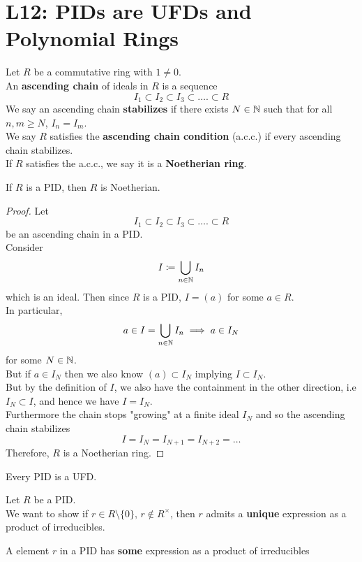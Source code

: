 \documentclass[../Main.tex]{subfiles}
\begin{document}
\chapter{L12: PIDs are UFDs and Polynomial Rings}
\begin{dfn}[title = {Ascending Chains, Noetherian Ring}]
	Let $R$ be a commutative ring with $1\ne 0$.\\
	An \textbf{ascending chain} of ideals in $R$ is a sequence
	\[I_1\subset I_2\subset I_3\subset\dots.\subset R\]
	We say an ascending chain \textbf{stabilizes} if there exists $N\in \mathbb{N}$ such that for all $n,m \ge N$, $I_n=I_m$.\\
	We say $R$ satisfies the \textbf{ascending chain condition} (a.c.c.) if every ascending chain stabilizes.\\
	If $R$ satisfies the a.c.c., we say it is a \textbf{Noetherian ring}.
\end{dfn}
\begin{thm}[title = PID is Noetherian]
	If $R$ is a PID, then $R$ is Noetherian.
\end{thm}
\begin{proof}
	Let
	\[I_1\subset I_2\subset I_3\subset\dots.\subset R\]
	be an ascending chain in a PID.\\
	Consider
	\[I\coloneqq \bigcup\limits_{n\in \mathbb{N}} I_n\]
	which is an ideal. Then since $R$ is a PID, $I=(a)$ for some $a\in R$.\\
	In particular,
	\[a\in I =\bigcup\limits_{n\in \mathbb{N}} I_n\implies a\in I_N \]
	for some $N\in \mathbb{N}$.\\
	But if $a\in I_N$ then we also know $(a)\subset I_N$ implying $I\subset I_N$. \\
	But by the definition of $I$, we also have the containment in the other direction, i.e $I_N \subset I$, and hence we have $I=I_N$.\\
	Furthermore the chain stops "growing" at a finite ideal $I_N$ and so the ascending chain stabilizes
	\[I=I_N=I_{N+1}=I_{N+2}=\dots\]
	Therefore, $R$ is a Noetherian ring.
\end{proof}
\begin{thm}[title = PID is UFD]
	Every PID is a UFD.
\end{thm}
Let $R$ be a PID.\\
We want to show if $r\in R\setminus \{0\},\, r\notin R^\times$,
then $r$ admits a \textbf{unique} expression as a product of irreducibles.
\newpage
\begin{lem}[title = Existence of product of irreducibles in PID]
	A element $r$ in a PID has \textbf{some} expression as a product of irreducibles
\end{lem}
\end{document}
